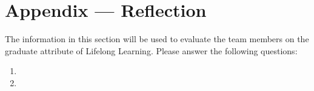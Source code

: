 \documentclass[12pt, titlepage]{article}
\begin{document}



\newpage{}
\section*{Appendix --- Reflection}

The information in this section will be used to evaluate the team members on the
graduate attribute of Lifelong Learning.  Please answer the following questions:

\begin{enumerate}
  \item 
  \item 
\end{enumerate}
\end{document}
